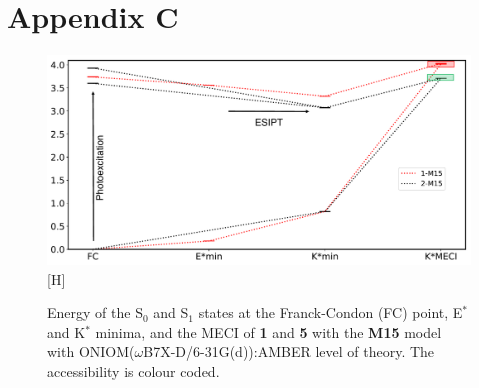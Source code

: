 \documentclass[a4paper,11.5pt]{report}
\def\szero{S$_{0}$}
\def\sone{S$_{1}$}
\def\Estar{E$^\ast$}
\def\Kstar{K$^\ast$}
\begin{document}
\section*{Appendix C}
\label{appendix4}
\begin{figure}[H]
\centering
  \includegraphics[width=0.8\linewidth]{Misc/M15.pdf}[H]
    \caption[Decay mechanism in the molecular crystal in \textbf{M15} model]{Energy of the \szero{} and \sone{} states at the  Franck-Condon (FC) point, \Estar{} and \Kstar{} minima, and the MECI of \textbf{1} and \textbf{5} with the \textbf{M15} model with ONIOM($\omega$B7X-D/6-31G(d)):AMBER level of theory. The accessibility is colour coded.}
  \label{figure: Solid_Mechanism_M15}
\end{figure}
\newpage
\end{document}
